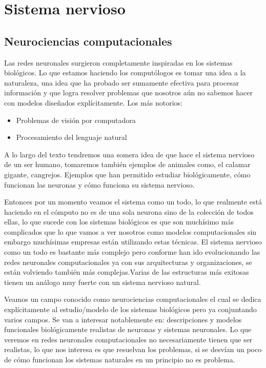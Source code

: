 \section{Sistema nervioso}

\subsection{Neurociencias computacionales}

Las redes neuronales surgieron completamente inspiradas en los sistemas biológicos. 
Lo que estamos haciendo los computólogos es tomar una idea a la naturaleza, una idea que ha probado ser sumamente efectiva para procesar información y que logra resolver problemas que nosotros aún no sabemos hacer con modelos diseñados explícitamente.
Los más notorios: 
\begin{itemize}
\item Problemas de visión por computadora 
\item Procesamiento del lenguaje natural 
\end{itemize}

A lo largo del texto tendremos una somera idea de que hace el sistema nervioso de un ser humano, tomaremos también ejemplos de animales como, el calamar gigante, cangrejos. Ejemplos que han permitido estudiar biológicamente, cómo funcionan las neuronas y cómo funciona su sistema nervioso. 

Entonces por un momento veamos el sistema como un todo, lo que realmente está haciendo en el cómputo no es de una sola neurona sino de la colección de todos ellas, lo que sucede con los sistemas biológicos es que son muchísimo más complicados que lo que vamos a ver nosotros como modelos computacionales sin embargo muchísimas empresas están utilizando estas técnicas. 
El sistema nervioso como un todo es bastante más complejo pero conforme han ido evolucionando las redes neuronales computacionales ya con sus arquitecturas y organizaciones, se están volviendo también más complejas.Varias de las estructuras más exitosas tienen un análogo muy fuerte con un sistema nervioso natural. 

Veamos un campo conocido como neurociencias computacionales el cual se dedica explícitamente al estudio/modelo de los sistemas biológicos pero ya conjuntando varios campos. Se van a interesar notablemente en:  descripciones y modelos funcionales biológicamente realistas de neuronas y sistemas neuronales. Lo que veremos en redes neuronales computacionales no necesariamente tienen que ser realistas, lo que nos interesa es que resuelvan los problemas, si se desvían un poco de cómo funcionan los sistemas naturales en un principio no es problema. 


